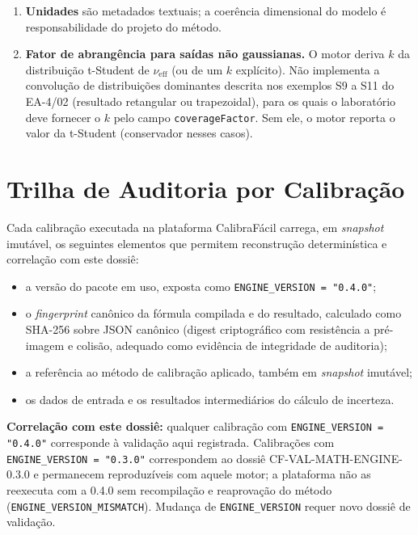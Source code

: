\documentclass[11pt,a4paper]{article}
\newcommand{\docVersion}{0.4.0}
\newcommand{\previousVersion}{0.3.0}
\begin{document}
\begin{enumerate}
  \item \textbf{Unidades} são metadados textuais; a coerência dimensional do modelo é responsabilidade do projeto do método.
  \item \textbf{Fator de abrangência para saídas não gaussianas.} O motor deriva \(k\) da distribuição t-Student de \(\nu_{\text{eff}}\) (ou de um \(k\) explícito). Não implementa a convolução de distribuições dominantes descrita nos exemplos S9 a S11 do EA-4/02 (resultado retangular ou trapezoidal), para os quais o laboratório deve fornecer o \(k\) pelo campo \texttt{coverageFactor}. Sem ele, o motor reporta o valor da t-Student (conservador nesses casos).
\end{enumerate}

\section{Trilha de Auditoria por Calibração}

Cada calibração executada na plataforma CalibraFácil carrega, em \emph{snapshot} imutável, os seguintes elementos que permitem reconstrução determinística e correlação com este dossiê:

\begin{itemize}
  \item a versão do pacote em uso, exposta como \texttt{ENGINE\_VERSION = "\docVersion"};
  \item o \emph{fingerprint} canônico da fórmula compilada e do resultado, calculado como SHA-256 sobre JSON canônico (digest criptográfico com resistência a pré-imagem e colisão, adequado como evidência de integridade de auditoria);
  \item a referência ao método de calibração aplicado, também em \emph{snapshot} imutável;
  \item os dados de entrada e os resultados intermediários do cálculo de incerteza.
\end{itemize}

\textbf{Correlação com este dossiê:} qualquer calibração com \texttt{ENGINE\_VERSION = "\docVersion"} corresponde à validação aqui registrada. Calibrações com \texttt{ENGINE\_VERSION = "\previousVersion"} correspondem ao dossiê CF-VAL-MATH-ENGINE-0.3.0 e permanecem reproduzíveis com aquele motor; a plataforma não as reexecuta com a \docVersion{} sem recompilação e reaprovação do método (\texttt{ENGINE\_VERSION\_MISMATCH}). Mudança de \texttt{ENGINE\_VERSION} requer novo dossiê de validação.
\end{document}
